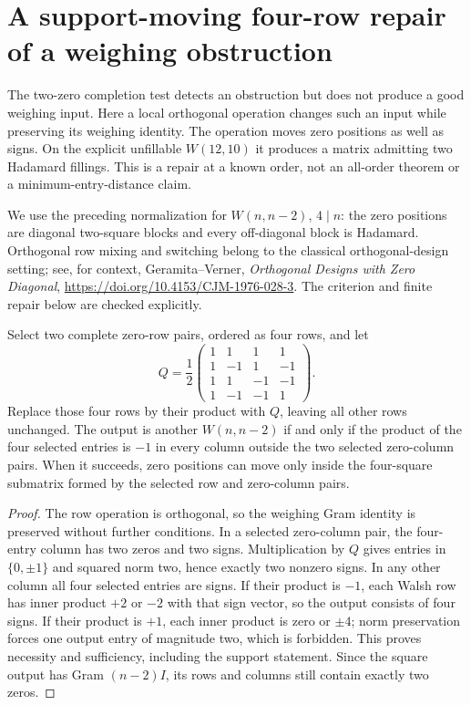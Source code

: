 \section{A support-moving four-row repair of a weighing obstruction}
\label{sec:weighing-switch-repair}

The two-zero completion test detects an obstruction but does not
produce a good weighing input. Here a local orthogonal operation
changes such an input while preserving its weighing identity.
The operation moves zero positions as well as signs. On the explicit
unfillable $W(12,10)$ it produces a matrix admitting two Hadamard
fillings. This is a repair at a known order, not an all-order theorem
or a minimum-entry-distance claim.

We use the preceding normalization for $W(n,n-2)$, $4\mid n$:
the zero positions are diagonal two-square blocks and every
off-diagonal block is Hadamard. Orthogonal row mixing and switching
belong to the classical orthogonal-design setting; see, for context,
Geramita--Verner, \emph{Orthogonal Designs with Zero Diagonal},
\url{https://doi.org/10.4153/CJM-1976-028-3}.
The criterion and finite repair below are checked explicitly.

\begin{theorem}
Select two complete zero-row pairs, ordered as four rows, and let
\[
 Q=\frac12\begin{pmatrix}
1&1&1&1\\1&-1&1&-1\\1&1&-1&-1\\1&-1&-1&1
\end{pmatrix}.
\]
Replace those four rows by their product with $Q$, leaving all
other rows unchanged. The output is another $W(n,n-2)$ if and
only if the product of the four selected entries is $-1$ in every
column outside the two selected zero-column pairs.
When it succeeds, zero positions can move only inside the four-square
submatrix formed by the selected row and zero-column pairs.
\end{theorem}
\begin{proof}
The row operation is orthogonal, so the weighing Gram identity is
preserved without further conditions. In a selected zero-column pair,
the four-entry column has two zeros and two signs. Multiplication
by $Q$ gives entries in $\{0,\pm1\}$ and squared norm two, hence
exactly two nonzero signs. In any other column all four selected
entries are signs. If their product is $-1$, each Walsh row has
inner product $+2$ or $-2$ with that sign vector, so the output
consists of four signs. If their product is $+1$, each inner product
is zero or $\pm4$; norm preservation forces one output entry of
magnitude two, which is forbidden. This proves necessity and
sufficiency, including the support statement. Since the square output
has Gram $(n-2)I$, its rows and columns still contain exactly two zeros.
\end{proof}

